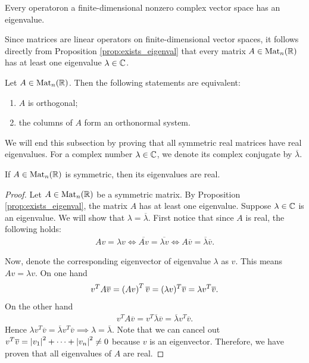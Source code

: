 \begin{prop}\label{prop:exists_eigenval}
Every operator\footnotemark[1] on a finite-dimensional nonzero complex vector space has an
eigenvalue.
\end{prop}


Since matrices are linear operators on finite-dimensional vector spaces, it follows directly from Proposition \ref{prop:exists_eigenval} that every matrix $A\in\text{Mat}_n(\mathbb{R})$ has at least one eigenvalue $\lambda\in\mathbb{C}$.

\begin{prop}\label{prop:orthog_equiv}
    Let $A\in\text{Mat}_n(\mathbb{R})$. Then the following statements are equivalent:
    \begin{enumerate}
        \renewcommand{\labelenumi}{(\roman*)}
        \item $A$ is orthogonal;
        \item the columns of $A$ form an orthonormal system.
    \end{enumerate}
\end{prop}

We will end this subsection by proving that all symmetric real matrices have real eigenvalues. For a complex number $\lambda\in\mathbb{C}$, we denote its complex conjugate by $\overline{\lambda}$.

\begin{lemma}\label{lemma_2.1}
    If $A\in\text{Mat}_n(\mathbb{R})$ is symmetric, then its eigenvalues are real.
\end{lemma}
\begin{proof}
    Let $A\in\text{Mat}_n(\mathbb{R})$ be a symmetric matrix. By Proposition \ref{prop:exists_eigenval}, the matrix $A$ has at least one eigenvalue. Suppose $\lambda\in\mathbb{C}$ is an eigenvalue. We will show that $\lambda = \overline{\lambda}$. First notice that since $A$ is real, the following holds:
    \begin{gather*}
        Av = \lambda v \Leftrightarrow \overline{A v} = \overline{\lambda v} \Leftrightarrow A\overline{v} = \overline{\lambda}\overline{v}.
    \end{gather*}
    
    Now, denote the corresponding eigenvector of eigenvalue $\lambda$ as $v$. This means $Av = \lambda v$. On one hand
    \begin{gather*}
            v^TA\overline{v} = \left( Av\right) ^T \overline{v} = (\lambda v)^T\overline{v} = \lambda v^T \overline{v}.
   \end{gather*} 
    On the other hand
        \begin{gather*}
            v^TA\overline{v} = v^T\overline{\lambda}\overline{v}=\overline{\lambda} v^T\overline{v}.
        \end{gather*}
    Hence $\lambda v^T\overline{v} = \overline{\lambda}v^T\overline{v} \implies \lambda = \overline{\lambda}$. Note that we can cancel out $v^T\overline{v} = \left|v_1\right|^2+\dots+\left|v_n\right|^2\neq 0$ because $v$ is an eigenvector. Therefore, we have proven that all eigenvalues of $A$ are real.
\end{proof}

